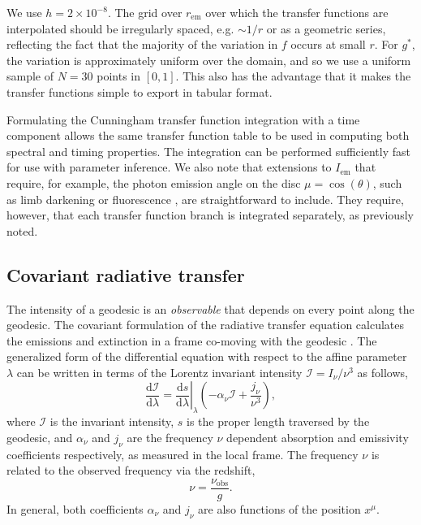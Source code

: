 \documentclass[fleqn,usenatbib]{mnras}
\renewcommand{\d}{\text{d}}
\newcommand{\rhoem}{r_\text{em}}
\begin{document}
We use $h = 2 \times 10^{-8}$. The grid over $\rhoem$ over which the transfer
functions are interpolated should be irregularly spaced, e.g.  $\sim 1 / r$ or
as a geometric series, reflecting the fact that the majority of the variation in
$f$ occurs at small $r$. For $g^\ast$, the variation is approximately uniform
over the domain, and so we use a uniform sample of $N = 30$ points in $[0,1]$.
This also has the advantage that it makes the transfer functions simple to
export in tabular format.

Formulating the Cunningham transfer function integration with a time component
allows the same transfer function table to be used in computing both spectral
and timing properties. The integration can be performed sufficiently fast for
use with parameter inference. We also note that extensions to $I_\text{em}$ that
require, for example, the photon emission angle on the disc $\mu =
\cos(\theta)$, such as limb darkening or fluorescence
\citep{matt_reflection_1993}, are straightforward to include. They require,
however, that each transfer function branch is integrated separately, as
previously noted.


\subsection{Covariant radiative transfer}

The intensity of a geodesic is an \emph{observable} that depends on every point
along the geodesic. The covariant formulation of the radiative transfer equation
calculates the emissions and extinction in a frame co-moving with the geodesic
\citep{fuerst_radiation_2004,younsi_general_2012}. The generalized form of the
differential equation with respect to the affine parameter $\lambda$ can be
written in terms of the Lorentz invariant intensity $\mathcal{I} = I_\nu /
\nu^3$ \citep{lindquist_louville_1966} as follows,
\begin{equation}
    \label{eq:covariant-radiative-transfer}
    \frac{\d \mathcal{I}}{\d \lambda} = \left. \frac{\d s}{\d \lambda} \right\rvert_\lambda \left( -\alpha_\nu \mathcal{I} + \frac{j_\nu}{\nu^3} \right),
\end{equation}
where $\mathcal{I}$ is the invariant intensity, $s$ is the proper length
traversed by the geodesic, and $\alpha_\nu$ and $j_\nu$ are the frequency $\nu$
dependent absorption and emissivity coefficients respectively, as measured in
the local frame. The frequency $\nu$ is related to the observed frequency via
the redshift,
\begin{equation}
    \nu = \frac{\nu_\text{obs}}{g}.
\end{equation}
In general, both coefficients $\alpha_\nu$ and $j_\nu$ are also functions of the
position $x^\mu$.
\end{document}
